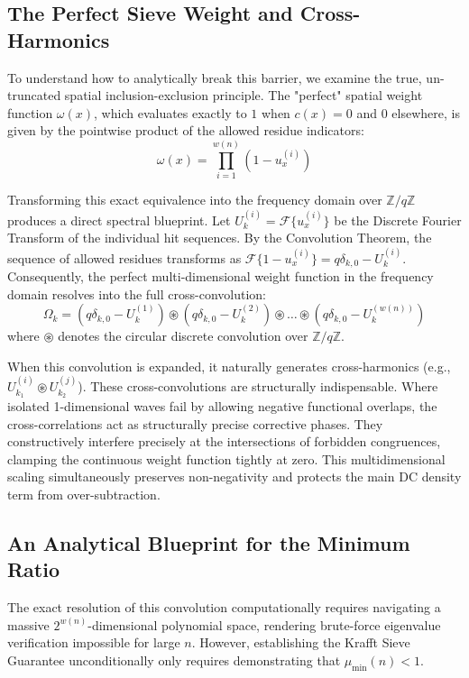\documentclass[lean]{AFM}
\renewcommand{\.}{\hskip .75pt}
\begin{document}
\subsection{The Perfect Sieve Weight and Cross-Harmonics}

To understand how to analytically break this barrier, we examine the true, un-truncated spatial
inclusion-exclusion principle. The "perfect" spatial weight function $\omega(x)$, which evaluates
exactly to $1$ when $c(x) = 0$ and $0$ elsewhere, is given by the pointwise product of the allowed
residue indicators:
$$ \omega(x) = \prod_{i=1}^{w(n)} \left(1 - u^{(i)}_x\right) $$

Transforming this exact equivalence into the frequency domain over $\mathbb{Z}/q\mathbb{Z}$
produces a direct spectral blueprint. Let $U^{(i)}_k = \mathcal{F}\{u^{(i)}_x\}$ be the Discrete
Fourier Transform of the individual hit sequences. By the Convolution Theorem, the sequence of
allowed residues transforms as $\mathcal{F}\{1 - u^{(i)}_x\} = q\delta_{k,0} - U^{(i)}_k$.
Consequently, the perfect multi-dimensional weight function in the frequency domain resolves into
the full cross-convolution:
$$ \Omega_k = \left(q\delta_{k,0} - U^{(1)}_k\right) \circledast \left(q\delta_{k,0} - U^{(2)}_k\right)
\circledast \dots \circledast \left(q\delta_{k,0} - U^{(w(n))}_k\right) $$
where $\circledast$ denotes the circular discrete convolution over $\mathbb{Z}/q\mathbb{Z}$.

When this convolution is expanded, it naturally generates cross-harmonics (e.g.,
$U^{(i)}_{k_1} \circledast U^{(j)}_{k_2}$). These cross-convolutions are structurally
indispensable. Where isolated 1-dimensional waves fail by allowing negative functional overlaps,
the cross-correlations act as structurally precise corrective phases. They constructively
interfere precisely at the intersections of forbidden congruences, clamping the continuous weight
function tightly at zero. This multidimensional scaling simultaneously preserves non-negativity
and protects the main DC density term from over-subtraction.

\subsection{An Analytical Blueprint for the Minimum Ratio}

The exact resolution of this convolution computationally requires navigating a massive
$2^{w(n)}$-dimensional polynomial space, rendering brute-force eigenvalue verification impossible
for large $n$. However, establishing the Krafft Sieve Guarantee unconditionally only requires
demonstrating that $\mu_{\min}(n) < 1$. 
\end{document}

